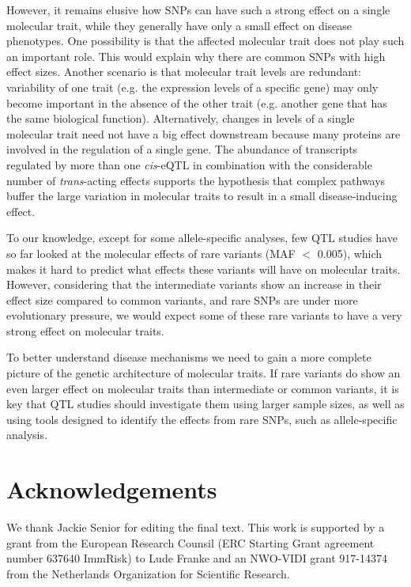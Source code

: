 However, it remains elusive how SNPs can have such a strong effect on a single molecular trait, while they generally have only a small effect on disease phenotypes. One possibility is that the affected molecular trait does not play such an important role. This would explain why there are common SNPs with high effect sizes. Another scenario is that molecular trait levels are redundant: variability of one trait (e.g. the expression levels of a specific gene) may only become important in the absence of the other trait (e.g. another gene that has the same biological function). Alternatively, changes in levels of a single molecular trait need not have a big effect downstream because many proteins are involved in the regulation of a single gene. The abundance of transcripts regulated by more than one \textit{cis}-eQTL in combination with the considerable number of \textit{trans}-acting effects supports the hypothesis that complex pathways buffer the large variation in molecular traits to result in a small disease-inducing effect.

To our knowledge, except for some allele-specific analyses, few QTL studies have so far looked at the molecular effects of rare variants (MAF $<$ 0.005), which makes it hard to predict what effects these variants will have on molecular traits. However, considering that the intermediate variants show an increase in their effect size compared to common variants, and rare SNPs are under more evolutionary pressure, we would expect some of these rare variants to have a very strong effect on molecular traits.

To better understand disease mechanisms we need to gain a more complete picture of the genetic architecture of molecular traits. If rare variants do show an even larger effect on molecular traits than intermediate or common variants, it is key that QTL studies should investigate them using larger sample sizes, as well as using tools designed to identify the effects from rare SNPs, such as allele-specific analysis. 


\section*{Acknowledgements}
We thank Jackie Senior for editing the final text. This work is supported by a grant from the European Research Counsil (ERC Starting Grant agreement number 637640 ImmRisk) to Lude Franke and an NWO-VIDI grant 917-14374 from the Netherlands Organization for Scientific Research. 





\leftwatermark{}
\rightwatermark{}
